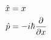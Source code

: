 

\vspace*{\fill}
\centering

\begin{align*}
    \hat{x} &= x \\
    \hat{p} &= -i\hbar\pdv{x}
\end{align*}

\centering
\vspace*{\fill}

